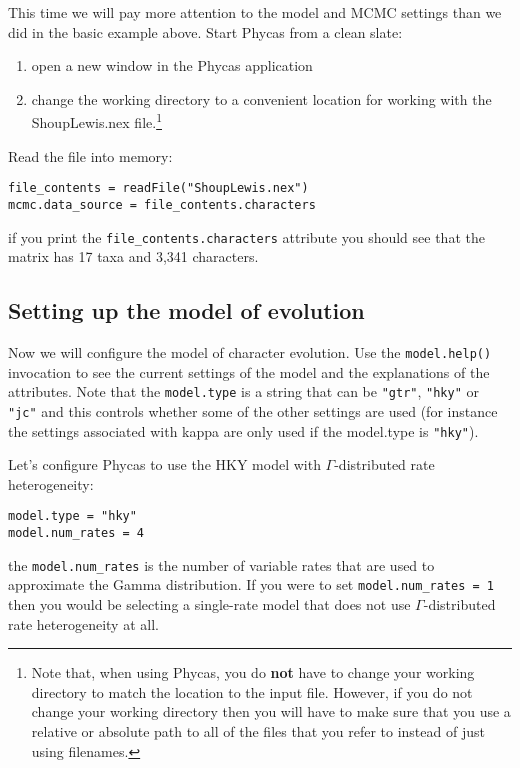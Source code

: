 \documentclass{article}
\newcommand{\cmd}[1]{\texttt{#1}\xspace}
\newcommand{\phycas}{Phycas\xspace}
\newcommand{\localfile}[1]{\textsf{#1}\xspace}
\begin{document}
This time we will pay more attention to the model and MCMC settings than we did in the basic example above.
Start \phycas from a clean slate:
\begin{enumerate}
	\item open a new window in the \phycas application
	\item change the working directory to a convenient location for working with the \localfile{ShoupLewis.nex} file.\footnote{Note that, when using \phycas,  you do {\bf not} have to change your working directory to match the location to the input file.
	However, if you do not change your working directory then you will have to make sure that you use a relative or absolute path to all of the files that you refer to instead of just using filenames.}
\end{enumerate}

Read the file into memory:
\begin{verbatim}
file_contents = readFile("ShoupLewis.nex")
mcmc.data_source = file_contents.characters
\end{verbatim}
if you print the \cmd{file\_contents.characters} attribute you should see that the matrix has 17 taxa and 3,341 characters.

\subsection{Setting up the model of evolution}
Now we will configure the model of character evolution. 
Use the \cmd{model.help()} invocation to see the current settings of the model and the explanations of the
attributes.
Note that the \cmd{model.type} is a string that can be \texttt{"gtr"}, \texttt{"hky"} or \texttt{"jc"} and this controls whether some of the other settings are used (for instance the settings associated with kappa are only used if the model.type is \texttt{"hky"}).

Let's configure \phycas to use the HKY model with $\Gamma$-distributed rate heterogeneity:

\begin{verbatim}
model.type = "hky"
model.num_rates = 4
\end{verbatim}
the \cmd{model.num\_rates} is the number of variable rates that are used to approximate the Gamma distribution. 
If you were to set \cmd{model.num\_rates = 1} then you would be selecting a single-rate model that does not use $\Gamma$-distributed rate heterogeneity at all.
\end{document}

